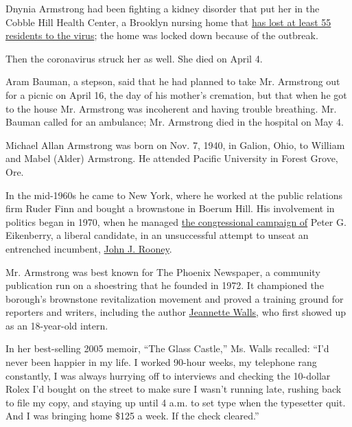 Dnynia Armstrong had been fighting a kidney disorder that put her in the
Cobble Hill Health Center, a Brooklyn nursing home that
\href{https://www.nytimes3xbfgragh.onion/2020/04/17/nyregion/new-york-nursing-homes-coronavirus-deaths.html}{has
lost at least 55 residents to the virus}; the home was locked down
because of the outbreak.

Then the coronavirus struck her as well. She died on April 4.

Aram Bauman, a stepson, said that he had planned to take Mr. Armstrong
out for a picnic on April 16, the day of his mother's cremation, but
that when he got to the house Mr. Armstrong was incoherent and having
trouble breathing. Mr. Bauman called for an ambulance; Mr. Armstrong
died in the hospital on May 4.

Michael Allan Armstrong was born on Nov. 7, 1940, in Galion, Ohio, to
William and Mabel (Alder) Armstrong. He attended Pacific University in
Forest Grove, Ore.

In the mid-1960s he came to New York, where he worked at the public
relations firm Ruder Finn and bought a brownstone in Boerum Hill. His
involvement in politics began in 1970, when he managed
\href{https://www.nytimes3xbfgragh.onion/1970/06/14/archives/students-work-for-rooney-rival-eikenberrys-stand-against-war-stirs.html}{the
congressional campaign of} Peter G. Eikenberry, a liberal candidate, in
an unsuccessful attempt to unseat an entrenched incumbent,
\href{https://www.nytimes3xbfgragh.onion/1975/10/28/archives/exrep-john-j-rooney-of-brooklyn-is-dead-at-71.html}{John
J. Rooney}.

Mr. Armstrong was best known for The Phoenix Newspaper, a community
publication run on a shoestring that he founded in 1972. It championed
the borough's brownstone revitalization movement and proved a training
ground for reporters and writers, including the author
\href{https://www.nytimes3xbfgragh.onion/2013/05/26/magazine/how-jeannette-walls-spins-good-stories-out-of-bad-memories.html}{Jeannette
Walls}, who first showed up as an 18-year-old intern.

In her best-selling 2005 memoir, ``The Glass Castle,'' Ms. Walls
recalled: ``I'd never been happier in my life. I worked 90-hour weeks,
my telephone rang constantly, I was always hurrying off to interviews
and checking the 10-dollar Rolex I'd bought on the street to make sure I
wasn't running late, rushing back to file my copy, and staying up until
4 a.m. to set type when the typesetter quit. And I was bringing home
\$125 a week. If the check cleared.''

